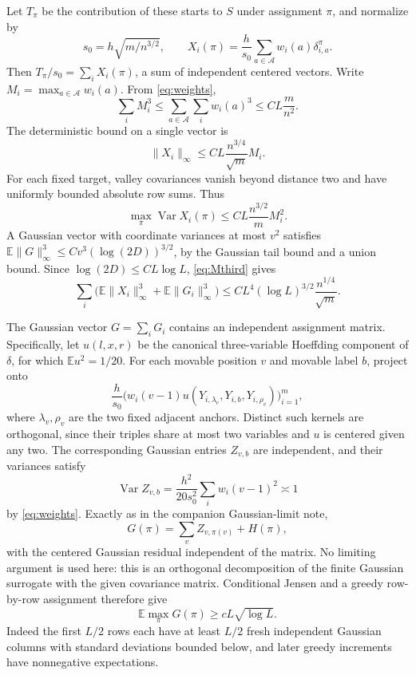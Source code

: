 \documentclass[11pt]{article}
\newcommand{\E}{\mathbb E}
\newcommand{\Var}{\operatorname{Var}}
\begin{document}
Let $T_\pi$ be the contribution of these starts to $S$ under assignment
$\pi$, and normalize by
\[
 s_0=h\sqrt{m/n^{3/2}},\qquad
 X_i(\pi)=\frac h{s_0}\sum_{a\in\mathcal A}
                 w_i(a)\delta_{i,a}^{\pi}.
\]
Then $T_\pi/s_0=\sum_iX_i(\pi)$, a sum of independent centered vectors.
Write $M_i=\max_{a\in\mathcal A}w_i(a)$. From \eqref{eq:weights},
\begin{equation}\label{eq:Mthird}
 \sum_iM_i^3\leq\sum_{a\in\mathcal A}\sum_iw_i(a)^3
 \leq CL\frac m{n^2}.
\end{equation}
The deterministic bound on a single vector is
\[
 \|X_i\|_\infty\leq C L\frac{n^{3/4}}{\sqrt m}M_i.
\]
For each fixed target, valley covariances vanish beyond distance two and
have uniformly bounded absolute row sums. Thus
\[
 \max_\pi\Var X_i(\pi)\leq CL\frac{n^{3/2}}m M_i^2.
\]
A Gaussian vector with coordinate variances at most $v^2$ satisfies
$\E\|G\|_\infty^3\leq Cv^3(\log(2D))^{3/2}$, by the Gaussian tail bound
and a union bound. Since $\log(2D)\leq CL\log L$, \eqref{eq:Mthird} gives
\begin{equation}\label{eq:third}
 \sum_i\bigl(\E\|X_i\|_\infty^3+\E\|G_i\|_\infty^3\bigr)
 \leq C L^4(\log L)^{3/2}\frac{n^{1/4}}{\sqrt m}.
\end{equation}

The Gaussian vector $G=\sum_iG_i$ contains an independent assignment
matrix. Specifically, let $u(l,x,r)$ be the canonical three-variable
Hoeffding component of $\delta$, for which $\E u^2=1/20$.
For each movable position $v$ and movable label $b$, project onto
\[
 \frac h{s_0}\bigl(w_i(v-1)
        u(Y_{i,\lambda_v},Y_{i,b},Y_{i,\rho_v})\bigr)_{i=1}^m,
\]
where $\lambda_v,\rho_v$ are the two fixed adjacent anchors. Distinct such
kernels are orthogonal, since their triples share at most two variables
and $u$ is centered given any two. The corresponding Gaussian entries
$Z_{v,b}$ are independent, and their variances satisfy
\[
 \Var Z_{v,b}=\frac{h^2}{20s_0^2}\sum_iw_i(v-1)^2\asymp1
\]
by \eqref{eq:weights}. Exactly as in the companion Gaussian-limit note,
\[
 G(\pi)=\sum_vZ_{v,\pi(v)}+H(\pi),
\]
with the centered Gaussian residual independent of the matrix. No limiting
argument is used here: this is an orthogonal decomposition of the finite
Gaussian surrogate with the given covariance matrix.
Conditional Jensen and a greedy row-by-row assignment therefore give
\begin{equation}\label{eq:gaussianmax}
 \E\max_\pi G(\pi)\geq cL\sqrt{\log L}.
\end{equation}
Indeed the first $L/2$ rows each have at least $L/2$ fresh independent
Gaussian columns with standard deviations bounded below, and later greedy
increments have nonnegative expectations.
\end{document}
